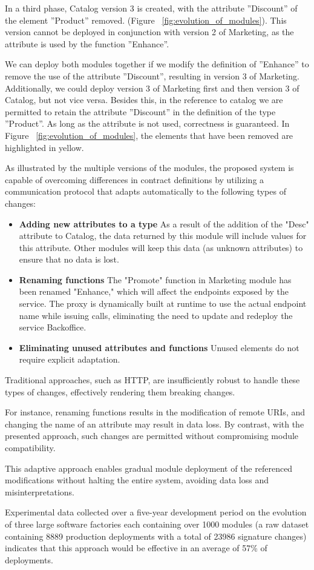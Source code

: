 In a third phase, Catalog version 3 is created, with the attribute ''Discount'' of the element ''Product'' removed.  (Figure ~\ref{fig:evolution_of_modules}).
This version cannot be deployed in conjunction with version 2 of Marketing, as the attribute is used by the function ''Enhance''.

We can deploy both modules together if we modify the definition of ''Enhance'' to remove the use of the attribute ''Discount'', resulting in version 3 of Marketing.
Additionally, we could deploy version 3 of Marketing first and then version 3 of Catalog, but not vice versa.
Besides this, in the reference to catalog we are permitted to retain the attribute ''Discount'' in the definition of the type ''Product''.
As long as the attribute is not used, correctness is guaranteed.
In Figure ~\ref{fig:evolution_of_modules}, the elements that have been removed are highlighted in yellow.

As illustrated by the multiple versions of the modules,
the proposed system is capable of overcoming differences in contract definitions by utilizing a communication protocol
that adapts automatically to the following types of changes:

\begin{itemize}
    \item \textbf{Adding new attributes to a type} As a result of the addition of the "Desc" attribute to Catalog, the data returned by this module will include values for this attribute.
    Other modules will keep this data (as unknown attributes) to ensure that no data is lost.
    \item \textbf{Renaming functions} The "Promote" function in Marketing module has been renamed "Enhance," which will affect the endpoints exposed by the service.
    The proxy is dynamically built at runtime to use the actual endpoint name while issuing calls, eliminating the need to update and redeploy the service Backoffice.
    \item \textbf{Eliminating unused attributes and functions} Unused elements do not require explicit adaptation.
\end{itemize}

Traditional approaches, such as HTTP, are insufficiently robust to handle these types of changes, effectively rendering them breaking changes.

For instance, renaming functions results in the modification of remote URIs, and changing the name of an attribute may result in data loss.
By contrast, with the presented approach, such changes are permitted without compromising module compatibility.

This adaptive approach enables gradual module deployment of the referenced modifications without halting the entire system, avoiding data loss and misinterpretations.

Experimental data \cite{seco2020robust} collected over a five-year development period on the evolution of three large software factories each containing over 1000 modules
(a raw dataset containing 8889 production deployments with a total of 23986 signature changes)
indicates that this approach would be effective in an average of 57\% of deployments.
